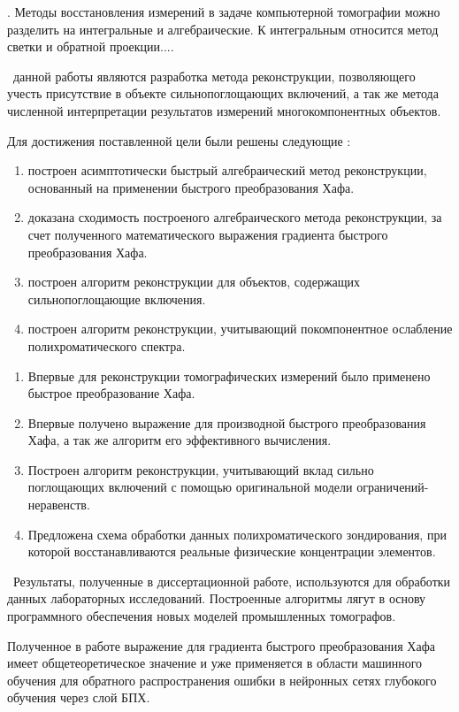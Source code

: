 {\actualityandprogress}. Методы восстановления измерений в задаче компьютерной томографии можно разделить на интегральные и алгебраические. К интегральным относится метод светки и обратной проекции....

{\aim} ~данной работы являются разработка метода реконструкции, позволяющего учесть присутствие в объекте сильнопоглощающих включений, а так же метода численной интерпретации результатов измерений многокомпонентных объектов.

Для достижения поставленной цели были решены следующие {\tasks}:
\begin{enumerate}
  \item построен асимптотически быстрый алгебраический метод реконструкции, основанный на применении быстрого преобразования Хафа.
  \item доказана сходимость построеного алгебраического метода реконструкции, за счет полученного математического выражения градиента быстрого преобразования Хафа.
  \item построен алгоритм реконструкции для объектов, содержащих сильнопоглощающие включения.
  \item построен алгоритм реконструкции, учитывающий покомпонентное ослабление полихроматического спектра.
\end{enumerate}

{\novelty}
\begin{enumerate}
  \item Впервые для реконструкции томографических измерений было применено быстрое преобразование Хафа.
  \item Впервые получено выражение для производной быстрого преобразования Хафа, а так же алгоритм его эффективного вычисления.
  \item Построен алгоритм реконструкции, учитывающий вклад сильно поглощающих включений с помощью оригинальной модели ограничений-неравенств.
  \item Предложена схема обработки данных полихроматического зондирования, при которой восстанавливаются реальные физические концентрации элементов.
\end{enumerate}

{\influence} ~Результаты, полученные в диссертационной работе, используются для обработки данных лабораторных исследований. Построенные алгоритмы лягут в основу программного обеспечения новых моделей промышленных томографов.

Полученное в работе выражение для градиента быстрого преобразования Хафа имеет общетеоретическое значение и уже применяется в области машинного обучения для обратного распространения ошибки в нейронных сетях глубокого обучения через слой БПХ.

